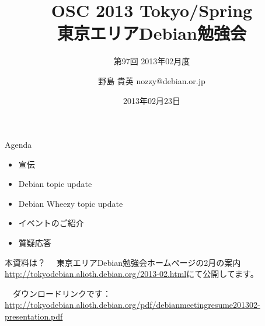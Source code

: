 \title{OSC 2013 Tokyo/Spring \\東京エリアDebian勉強会}
\subtitle{第97回 2013年02月度}
\author{野島 貴英 nozzy@debian.or.jp}
\date{2013年02月23日}



\frame{\titlepage{}}


\begin{frame}{Agenda}
 \begin{itemize}
  \item 宣伝
  \item Debian topic update 
  \item Debian Wheezy topic update
  \item イベントのご紹介
  \item 質疑応答
 \end{itemize}
\end{frame}

\begin{frame}{本資料は？}
　東京エリアDebian勉強会ホームページの2月の案内\url{http://tokyodebian.alioth.debian.org/2013-02.html}にて公開してます。

　ダウンロードリンクです：\\
   \url{http://tokyodebian.alioth.debian.org/pdf/debianmeetingresume201302-presentation.pdf}
\end{frame}

